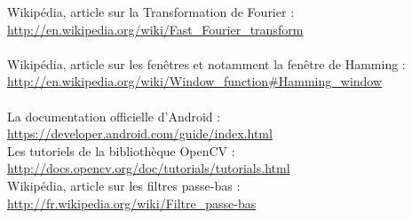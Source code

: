 \noindent
Wikipédia, article sur la Transformation de Fourier :
\url{http://en.wikipedia.org/wiki/Fast_Fourier_transform}\\
\\
Wikipédia, article sur les fenêtres et notamment la fenêtre de Hamming : 
\url{http://en.wikipedia.org/wiki/Window_function#Hamming_window}\\
\\
La documentation officielle d'Android : \url{https://developer.android.com/guide/index.html}\\

\noindent Les tutoriels de la bibliothèque OpenCV : \url{http://docs.opencv.org/doc/tutorials/tutorials.html}\\

\noindent Wikipédia, article sur les filtres passe-bas : \url{http://fr.wikipedia.org/wiki/Filtre_passe-bas}
